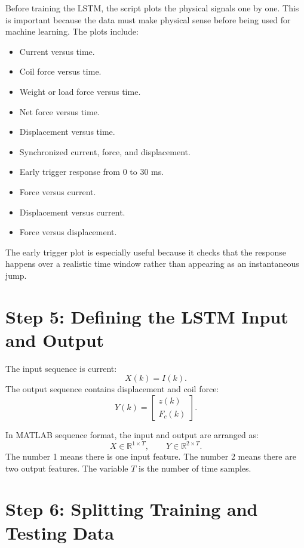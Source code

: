 \documentclass[11pt]{article}
\begin{document}
Before training the LSTM, the script plots the physical signals one by one. This is important because the data must make physical sense before being used for machine learning. The plots include:
\begin{itemize}[leftmargin=1.2cm]
    \item Current versus time.
    \item Coil force versus time.
    \item Weight or load force versus time.
    \item Net force versus time.
    \item Displacement versus time.
    \item Synchronized current, force, and displacement.
    \item Early trigger response from 0 to 30 ms.
    \item Force versus current.
    \item Displacement versus current.
    \item Force versus displacement.
\end{itemize}

The early trigger plot is especially useful because it checks that the response happens over a realistic time window rather than appearing as an instantaneous jump.

\section{Step 5: Defining the LSTM Input and Output}

The input sequence is current:
\begin{equation}
    X(k) = I(k).
\end{equation}
The output sequence contains displacement and coil force:
\begin{equation}
    Y(k) =
    \begin{bmatrix}
    z(k) \\
    F_c(k)
    \end{bmatrix}.
\end{equation}

In MATLAB sequence format, the input and output are arranged as:
\[
    X \in \mathbb{R}^{1 \times T}, \qquad Y \in \mathbb{R}^{2 \times T}.
\]
The number 1 means there is one input feature. The number 2 means there are two output features. The variable \(T\) is the number of time samples.

\section{Step 6: Splitting Training and Testing Data}
\end{document}
